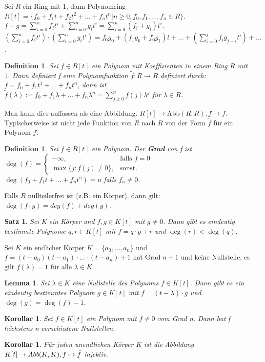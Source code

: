 \documentclass[12pt,a4paper]{article}
\theoremstyle{plain}
\newtheorem{Satz}[Theorem]{Satz}
\newtheorem{Lemma}[Theorem]{Lemma}
\newtheorem{Korollar}[Theorem]{Korollar}
\newtheorem{Definition}[Theorem]{Definition}
\newcommand{\herv}[1]{{\emph{\textbf{#1}}}}
\numberwithin{equation}{section}
\begin{document}
Sei $R$ ein Ring mit $1$, dann Polynomring $R[t]=\{f_0+f_1t+f_2t^2+\ldots+f_nt^n | n\geq 0, f_0,f_1,\ldots,f_n\in R\}$. $f+g=\sum_{i=0}^{n}{f_it^i}+\sum_{i=0}^{n}{g_it^i}=\sum_{i=0}^{n}{(f_i+g_i)t^i}$. $\left(\sum_{i=0}^{n}{f_it^i}\right)\cdot \left(\sum_{i=0}^{n}{g_it^i}\right)=f_0g_0+(f_1g_0+f_0g_1)t+\ldots+\left(\sum_{i=0}^{j}{f_ig_{j-i}t^i}\right)+\ldots$.
\begin{Definition}
Sei $f\in R[t]$ ein Polynom mit Koeffizienten in einem Ring $R$ mit $1$. Dann definiert f eine Polynomfunktion $\tilde{f}:R \rightarrow R$ definiert durch: $f=f_0+f_1t^1+\ldots+f_nt^n$, dann ist $\tilde{f}(\lambda):=f_0+f_1\lambda+\ldots+f_n\lambda^n=\sum_{j\geq 0}^n{f(j)\lambda^j}$ für $\lambda\in R$.
\end{Definition}
Man kann dies auffassen als eine Abbildung. $R[t]\rightarrow $Abb$(R,R), f\mapsto \tilde{f}$. Typischerweise ist nicht jede Funktion von $R$ nach $R$ von der Form $\tilde{f}$ für ein Polynom $f$.
\begin{Definition}
Sei $f\in R[t]$ ein Polynom. Der \herv{Grad} von f ist\\ $\deg(f)=\left\lbrace\begin{array}{ll} -\infty,&\text{falls }f=0\\ \max\{j: f(j)\neq 0\},&\text{sonst.}\end{array} \right.$ $\deg(f_0+f_1t+\ldots+f_nt^n)=n$ falls $f_n\neq 0$.
\end{Definition}
Falls $R$ nullteilerfrei ist (z.B. ein Körper), dann gilt: $\deg(f\cdot g)=deg(f)+deg(g)$.
\begin{Satz}
Sei K ein Körper und $f,g\in K[t]$ mit $g\neq 0$. Dann gibt es eindeutig bestimmte Polynome $q,r\in K[t]$ mit $f=q\cdot g+r$ und $\deg(r)<\deg(q)$.
\end{Satz}
Sei $K$ ein endlicher Körper $K=\{a_0,\ldots,a_n\}$ und $f=(t-a_0)(t-a_1)\cdot\ldots\cdot(t-a_n)+1$ hat Grad $n+1$ und keine Nullstelle, es gilt $f(\lambda)=1$ für alle $\lambda\in K$.
\begin{Lemma}
Sei $\lambda\in K$ eine Nullstelle des Polynoms $f\in K[t]$. Dann gibt es ein eindeutig bestimmtes Polynom $g\in K[t]$ mit $f=(t-\lambda)\cdot g$ und $\deg(g)=\deg(f)-1$.
\end{Lemma}
\begin{Korollar}
Sei $f\in K[t]$ ein Polynom mit $f\neq 0$ vom Grad n. Dann hat f höchstens n verschiedene Nullstellen.
\end{Korollar}
\begin{Korollar}
Für jeden unendlichen Körper $K$ ist die Abbildung $K[t]\rightarrow \emph{Abb}(K,K), f\mapsto \tilde{f}$ injektiv.
\end{Korollar}
\end{document}
